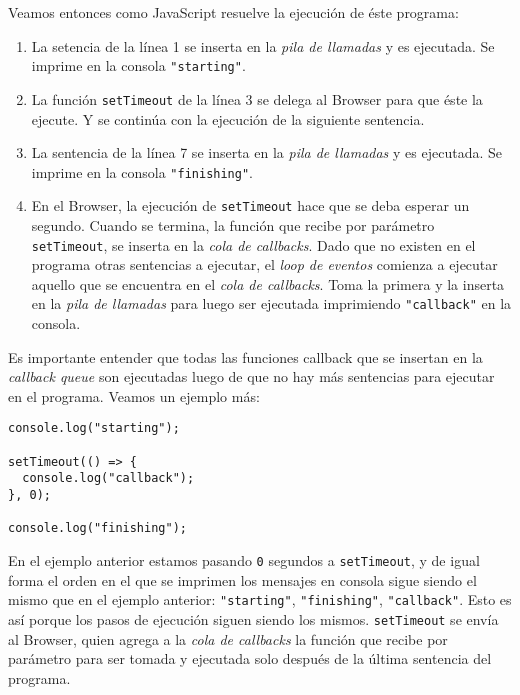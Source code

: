 \documentclass[a4paper, oneside, titlepage, 12pt]{paper}
\begin{document}
Veamos entonces como JavaScript resuelve la ejecución de éste programa:
\begin{enumerate}
\item La setencia de la línea 1 se inserta en la \textit{pila de llamadas} y es ejecutada. Se imprime en la consola \texttt{"starting"}. 
\item La función \texttt{setTimeout} de la línea 3 se delega al Browser para que éste la ejecute. Y se continúa con la ejecución de la siguiente sentencia.
\item La sentencia de la línea 7 se inserta en la \textit{pila de llamadas} y es ejecutada. Se imprime en la consola \texttt{"finishing"}.
\item En el Browser, la ejecución de \texttt{setTimeout} hace que se deba esperar un segundo. Cuando se termina, la función que recibe por parámetro \texttt{setTimeout}, se inserta en la \textit{cola de callbacks}. Dado que no existen en el programa otras sentencias a ejecutar, el \textit{loop de eventos} comienza a ejecutar aquello que se encuentra en el \textit{cola de callbacks}. Toma la primera y la inserta en la \textit{pila de llamadas} para luego ser ejecutada imprimiendo \texttt{"callback"} en la consola.
\end{enumerate}

Es importante entender que todas las funciones callback que se insertan en la \textit{callback queue} son ejecutadas luego de que no hay más sentencias para ejecutar en el programa. Veamos un ejemplo más:

\begin{verbatim}
console.log("starting");

setTimeout(() => {
  console.log("callback");
}, 0);

console.log("finishing");
\end{verbatim}

En el ejemplo anterior estamos pasando \texttt{0} segundos a \texttt{setTimeout}, y de igual forma el orden en el que se imprimen los mensajes en consola sigue siendo el mismo que en el ejemplo anterior: \texttt{"starting"}, \texttt{"finishing"}, \texttt{"callback"}. Esto es así porque los pasos de ejecución siguen siendo los mismos. \texttt{setTimeout} se envía al Browser, quien agrega a la \textit{cola de callbacks} la función que recibe por parámetro para ser tomada y ejecutada solo después de la última sentencia del programa.
\newline
\end{document}
